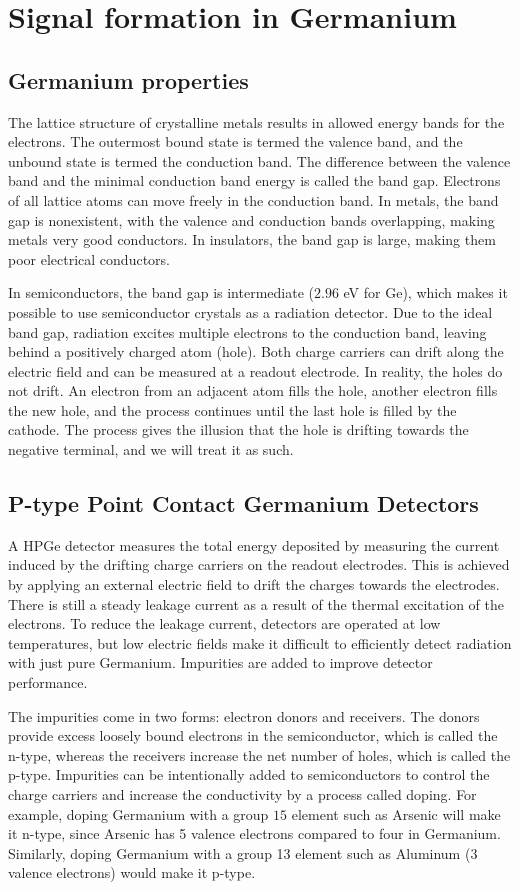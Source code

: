 \section{Signal formation in Germanium}
\subsection{Germanium properties}
The lattice structure of crystalline metals results in allowed energy bands for the electrons. The outermost bound state is termed the valence band, and the unbound state is termed the conduction band. The difference between the valence band and the minimal conduction band energy is called the band gap. Electrons of all lattice atoms can move freely in the conduction band. In metals, the band gap is nonexistent, with the valence and conduction bands overlapping, making metals very good conductors. In insulators, the band gap is large, making them poor electrical conductors.

In semiconductors, the band gap is intermediate ($2.96$ eV for Ge), which makes it possible to use semiconductor crystals as a radiation detector. Due to the ideal band gap, radiation excites multiple electrons to the conduction band, leaving behind a positively charged atom (hole). Both charge carriers can drift along the electric field and can be measured at a readout electrode. In reality, the holes do not drift. An electron from an adjacent atom fills the hole, another electron fills the new hole, and the process continues until the last hole is filled by the cathode. The process gives the illusion that the hole is drifting towards the negative terminal, and we will treat it as such. 

\subsection{P-type Point Contact Germanium Detectors}
A HPGe detector measures the total energy deposited by measuring the current induced by the drifting charge carriers on the readout electrodes. This is achieved by applying an external electric field to drift the charges towards the electrodes. There is still a steady leakage current as a result of the thermal excitation of the electrons. To reduce the leakage current, detectors are operated at low temperatures, but low electric fields make it difficult to efficiently detect radiation with just pure Germanium. Impurities are added to improve detector performance.

The impurities come in two forms: electron donors and receivers. The donors provide excess loosely bound electrons in the semiconductor, which is called the n-type, whereas the receivers increase the net number of holes, which is called the p-type. Impurities can be intentionally added to semiconductors to control the charge carriers and increase the conductivity by a process called doping. For example, doping Germanium with a group $15$ element such as Arsenic will make it n-type, since Arsenic has 5 valence electrons compared to four in Germanium. Similarly, doping Germanium with a group 13 element such as Aluminum (3 valence electrons) would make it p-type. \cite{knoll_2010}

